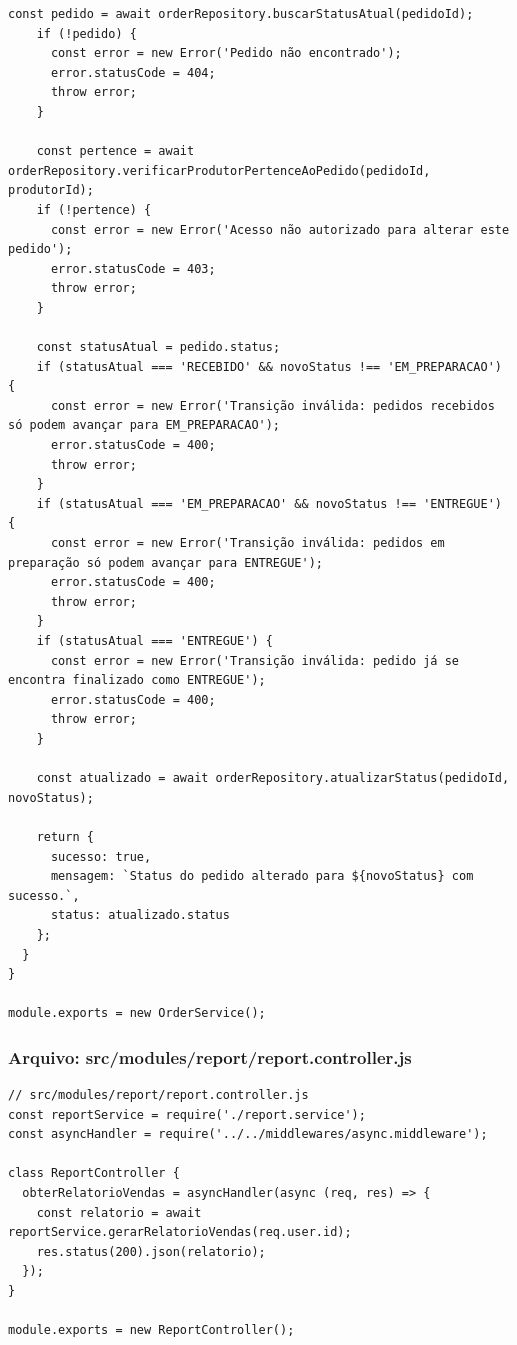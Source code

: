 \begin{lstlisting}[caption={src/modules/order/order.service.js}]
    const pedido = await orderRepository.buscarStatusAtual(pedidoId);
    if (!pedido) {
      const error = new Error('Pedido não encontrado');
      error.statusCode = 404;
      throw error;
    }

    const pertence = await orderRepository.verificarProdutorPertenceAoPedido(pedidoId, produtorId);
    if (!pertence) {
      const error = new Error('Acesso não autorizado para alterar este pedido');
      error.statusCode = 403;
      throw error;
    }

    const statusAtual = pedido.status;
    if (statusAtual === 'RECEBIDO' && novoStatus !== 'EM_PREPARACAO') {
      const error = new Error('Transição inválida: pedidos recebidos só podem avançar para EM_PREPARACAO');
      error.statusCode = 400;
      throw error;
    }
    if (statusAtual === 'EM_PREPARACAO' && novoStatus !== 'ENTREGUE') {
      const error = new Error('Transição inválida: pedidos em preparação só podem avançar para ENTREGUE');
      error.statusCode = 400;
      throw error;
    }
    if (statusAtual === 'ENTREGUE') {
      const error = new Error('Transição inválida: pedido já se encontra finalizado como ENTREGUE');
      error.statusCode = 400;
      throw error;
    }

    const atualizado = await orderRepository.atualizarStatus(pedidoId, novoStatus);
    
    return { 
      sucesso: true, 
      mensagem: `Status do pedido alterado para ${novoStatus} com sucesso.`,
      status: atualizado.status
    };
  }
}

module.exports = new OrderService();\end{lstlisting}
\vspace{0.5cm}
\subsubsection*{Arquivo: src/modules/report/report.controller.js}
\begin{lstlisting}[caption={src/modules/report/report.controller.js}]
// src/modules/report/report.controller.js
const reportService = require('./report.service');
const asyncHandler = require('../../middlewares/async.middleware');

class ReportController {
  obterRelatorioVendas = asyncHandler(async (req, res) => {
    const relatorio = await reportService.gerarRelatorioVendas(req.user.id);
    res.status(200).json(relatorio);
  });
}

module.exports = new ReportController();\end{lstlisting}
\vspace{0.5cm}
